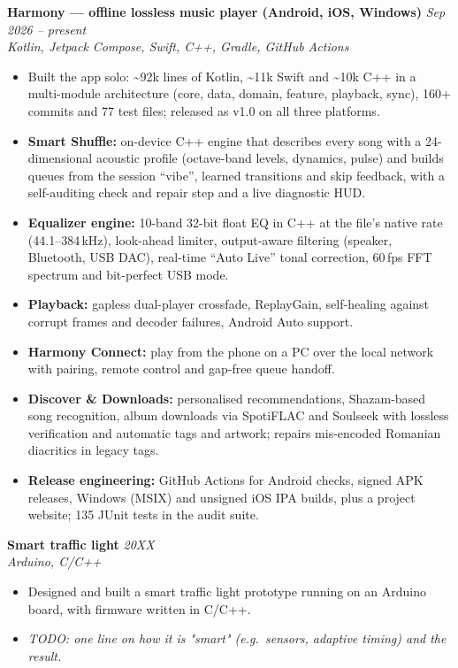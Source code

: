 \documentclass[10pt,a4paper]{article}
\newcommand{\entry}[3]{\textbf{#1} \hfill \textit{#3}\\[-0.1em]\textit{#2}}
\begin{document}
\entry{Harmony --- offline lossless music player (Android, iOS, Windows)}{Kotlin, Jetpack Compose, Swift, C++, Gradle, GitHub Actions}{Sep 2026 -- present}
\begin{itemize}
  \item Built the app solo: \textasciitilde92k lines of Kotlin, \textasciitilde11k Swift and \textasciitilde10k C++ in a multi-module architecture (core, data, domain, feature, playback, sync), 160+ commits and 77 test files; released as v1.0 on all three platforms.
  \item \textbf{Smart Shuffle:} on-device C++ engine that describes every song with a 24-dimensional acoustic profile (octave-band levels, dynamics, pulse) and builds queues from the session ``vibe'', learned transitions and skip feedback, with a self-auditing check and repair step and a live diagnostic HUD.
  \item \textbf{Equalizer engine:} 10-band 32-bit float EQ in C++ at the file's native rate (44.1--384\,kHz), look-ahead limiter, output-aware filtering (speaker, Bluetooth, USB DAC), real-time ``Auto Live'' tonal correction, 60\,fps FFT spectrum and bit-perfect USB mode.
  \item \textbf{Playback:} gapless dual-player crossfade, ReplayGain, self-healing against corrupt frames and decoder failures, Android Auto support.
  \item \textbf{Harmony Connect:} play from the phone on a PC over the local network with pairing, remote control and gap-free queue handoff.
  \item \textbf{Discover \& Downloads:} personalised recommendations, Shazam-based song recognition, album downloads via SpotiFLAC and Soulseek with lossless verification and automatic tags and artwork; repairs mis-encoded Romanian diacritics in legacy tags.
  \item \textbf{Release engineering:} GitHub Actions for Android checks, signed APK releases, Windows (MSIX) and unsigned iOS IPA builds, plus a project website; 135 JUnit tests in the audit suite.
\end{itemize}

\vspace{3pt}
\entry{Smart traffic light}{Arduino, C/C++}{20XX}
\begin{itemize}
  \item Designed and built a smart traffic light prototype running on an Arduino board, with firmware written in C/C++.
  \item \textit{TODO: one line on how it is "smart" (e.g.\ sensors, adaptive timing) and the result.}
\end{itemize}
\end{document}
